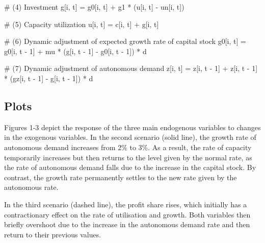 \documentclass[
  letterpaper,
  DIV=11,
  numbers=noendperiod]{scrreprt}
\newenvironment{Shaded}{\begin{snugshade}}{\end{snugshade}}
\newcommand{\CommentTok}[1]{\textcolor[rgb]{0.37,0.37,0.37}{#1}}
\newcommand{\DecValTok}[1]{\textcolor[rgb]{0.68,0.00,0.00}{#1}}
\newcommand{\NormalTok}[1]{\textcolor[rgb]{0.00,0.23,0.31}{#1}}
\newcommand{\OperatorTok}[1]{\textcolor[rgb]{0.37,0.37,0.37}{#1}}
\begin{document}
\begin{tcolorbox}
\begin{Shaded}
\begin{Highlighting}[]
            \CommentTok{\# (4) Investment}
\NormalTok{            g[i, t] }\OperatorTok{=}\NormalTok{ g0[i, t] }\OperatorTok{+}\NormalTok{ g1 }\OperatorTok{*}\NormalTok{ (u[i, t] }\OperatorTok{{-}}\NormalTok{ un[i, t])}

            \CommentTok{\# (5) Capacity utilization}
\NormalTok{            u[i, t] }\OperatorTok{=}\NormalTok{ c[i, t] }\OperatorTok{+}\NormalTok{ g[i, t]}

            \CommentTok{\# (6) Dynamic adjustment of expected growth rate of capital stock}
\NormalTok{            g0[i, t] }\OperatorTok{=}\NormalTok{ g0[i, t }\OperatorTok{{-}} \DecValTok{1}\NormalTok{] }\OperatorTok{+}\NormalTok{ mu }\OperatorTok{*}\NormalTok{ (g[i, t }\OperatorTok{{-}} \DecValTok{1}\NormalTok{] }\OperatorTok{{-}}\NormalTok{ g0[i, t }\OperatorTok{{-}} \DecValTok{1}\NormalTok{]) }\OperatorTok{*}\NormalTok{ d}

            \CommentTok{\# (7) Dynamic adjustment of autonomous demand}
\NormalTok{            z[i, t] }\OperatorTok{=}\NormalTok{ z[i, t }\OperatorTok{{-}} \DecValTok{1}\NormalTok{] }\OperatorTok{+}\NormalTok{ z[i, t }\OperatorTok{{-}} \DecValTok{1}\NormalTok{] }\OperatorTok{*}\NormalTok{ (gz[i, t }\OperatorTok{{-}} \DecValTok{1}\NormalTok{] }\OperatorTok{{-}}\NormalTok{ g[i, t }\OperatorTok{{-}} \DecValTok{1}\NormalTok{]) }\OperatorTok{*}\NormalTok{ d}
\end{Highlighting}
\end{Shaded}

\end{tcolorbox}

\subsection{Plots}\label{plots-8}

Figures 1-3 depict the response of the three main endogenous variables
to changes in the exogenous variables. In the second scenario (solid
line), the growth rate of autonomous demand increases from 2\% to 3\%.
As a result, the rate of capacity temporarily increases but then returns
to the level given by the normal rate, as the rate of autonomous demand
falls due to the increase in the capital stock. By contrast, the growth
rate permanently settles to the new rate given by the autonomous rate.

In the third scenario (dashed line), the profit share rises, which
initially has a contractionary effect on the rate of utilisation and
growth. Both variables then briefly overshoot due to the increase in the
autonomous demand rate and then return to their previous values.
\end{document}
